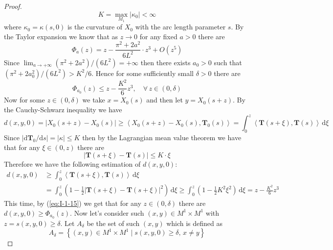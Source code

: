\begin{proof}
    \begin{equation*}
        K=\max_{M_1}{\left|\kappa_0\right|}<\infty
    \end{equation*}
    where $\kappa_0=\kappa(s,0)$ is the curvature of $X_0$ with the arc length parameter $s$. By the Taylor expansion we know that as $z\to 0$ for any fixed $a>0$ there are
    \begin{equation*}
        \Phi_a(z)=z-\frac{\pi^2+2a^2}{6L^2}\cdot z^3+O(z^5)
    \end{equation*}
    Since $\lim_{a\to+\infty}(\pi^2+2a^2)/(6L^2)=+\infty$ then there exists $a_0>0$ such that $(\pi^2+2a^2_0)/(6L^2)>K^2/6$. Hence for some sufficiently small $\delta>0$ there are
    \begin{equation}\label{eq:I-1-15}
        \Phi_{a_0}(z)\le z-\frac{K^2}{6}z^3,\quad\forall\, z\in (0,\delta)
    \end{equation}
    Now for some $z\in (0,\delta)$ we take $x=X_0(s)$ and then let $y=X_0(s+z)$. By the Cauchy-Schwarz inequality we have
    \begin{equation*}
        d(x,y,0)=\left|X_0(s+z)-X_0(s)\right|\ge\left<X_0(s+z)-X_0(s),\mathbf{T}_0(s)\right>=\int_{0}^{z}\left<\mathbf{T}(s+\xi),\mathbf{T}(s)\right>\,\mathrm{d}\xi
    \end{equation*}
    Since $\left|\mathrm{d}\mathbf{T}_0/\mathrm{d}s\right|=\left|\kappa\right|\le K$ then by the Lagrangian mean value theorem we have that for any $\xi\in(0,z)$ there are
    \begin{equation*}
        \left|\mathbf{T}(s+\xi)-\mathbf{T}(s)\right|\le K\cdot\xi
    \end{equation*}
    Therefore we have the following estimation of $d(x,y,0)$:
    \begin{align*}
        d(x,y,0)&\ge\int_{0}^{z}\left<\mathbf{T}(s+\xi),\mathbf{T}(s)\right>\,\mathrm{d}\xi\\
        &=\int_{0}^{z}\left(1-\frac{1}{2}{\left|\mathbf{T}(s+\xi)-\mathbf{T}(s+\xi)\right|}^2\right)\,\mathrm{d}\xi\ge\int_{0}^{z}\left(1-\frac{1}{2}K^2\xi^2\right)\,\mathrm{d}\xi=z-\frac{K^2}{6}z^3
    \end{align*}
    This time, by (\ref{eq:I-1-15}) we get that for any $z\in (0,\delta)$ there are $d(x,y,0)\ge \Phi_{a_0}(z)$. Now let's consider such $(x,y)\in M^1\times M^1$ with $z=s(x,y,0)\ge \delta$. Let $A_\delta$ be the set of such $(x,y)$ which is defined as
    \begin{equation*}
        A_\delta=\left\{(x,y)\in M^1\times M^1\mid s(x,y,0)\ge\delta,\, x\neq y\right\}

\end{equation*}
\end{proof}
